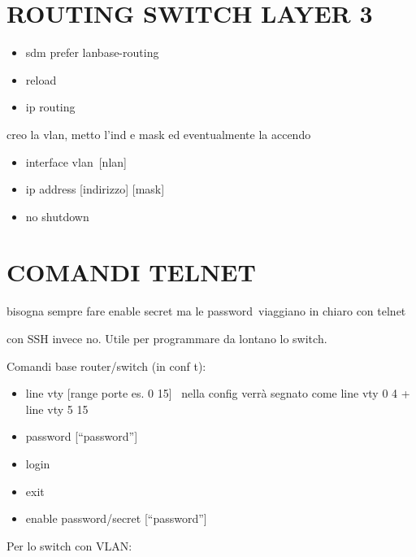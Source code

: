 \documentclass[
]{article}
\providecommand{\tightlist}{%
  \setlength{\itemsep}{0pt}\setlength{\parskip}{0pt}}
\begin{document}
{}

\section{\texorpdfstring{{ROUTING SWITCH LAYER
3}}{ROUTING SWITCH LAYER 3}}\label{h.uvsehtjtly7w}

\begin{itemize}
\tightlist
\item
  {sdm prefer lanbase-routing}
\item
  {reload}
\item
  {ip routing}
\end{itemize}

{}

{creo la vlan, metto l'ind e mask ed eventualmente la accendo}

\begin{itemize}
\tightlist
\item
  {interface }{vlan}{~{[}}{nlan}{{]}}
\item
  {ip address {[}indirizzo{]} {[}mask{]}}
\item
  {no shutdown}
\end{itemize}

{}

\section{\texorpdfstring{{COMANDI
TELNET}}{COMANDI TELNET}}\label{h.pcgz58enxrxl}

{bisogna sempre fare enable secret ma le password}{~}{viaggiano in
chiaro con telnet}

{con SSH invece no. Utile per programmare da lontano lo switch.}

{}

{Comandi base router/switch (in conf t):}

\begin{itemize}
\tightlist
\item
  {line vty {[}range porte es. 0 15{]}}{~ }{nella config verrà segnato
  come line vty 0 4 + line vty 5 15}
\item
  {password {[}``password''{]}}
\item
  {login}
\item
  {exit}
\item
  {enable password/secret {[}``password''{]}}
\end{itemize}

{}

{Per lo switch con VLAN:}
\end{document}
